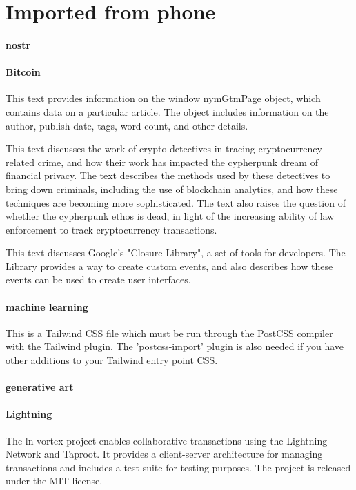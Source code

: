 \chapter{Imported from phone}
\subsubsection{nostr}
\subsubsection{Bitcoin}
This text provides information on the window nymGtmPage object, which contains data on a particular article. The object includes information on the author, publish date, tags, word count, and other details.

This text discusses the work of crypto detectives in tracing cryptocurrency-related crime, and how their work has impacted the cypherpunk dream of financial privacy. The text describes the methods used by these detectives to bring down criminals, including the use of blockchain analytics, and how these techniques are becoming more sophisticated. The text also raises the question of whether the cypherpunk ethos is dead, in light of the increasing ability of law enforcement to track cryptocurrency transactions.

This text discusses Google's "Closure Library", a set of tools for developers. The Library provides a way to create custom events, and also describes how these events can be used to create user interfaces.

\subsubsection{machine learning}
This is a Tailwind CSS file which must be run through the PostCSS compiler with the Tailwind plugin. The 'postcss-import' plugin is also needed if you have other additions to your Tailwind entry point CSS.

\subsubsection{generative art}
\subsubsection{Lightning}
The ln-vortex project enables collaborative transactions using the Lightning Network and Taproot. It provides a client-server architecture for managing transactions and includes a test suite for testing purposes. The project is released under the MIT license.

